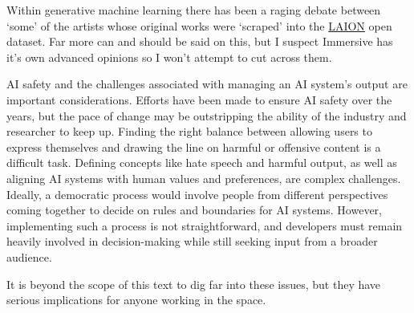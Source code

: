 Within generative machine learning there has been a raging debate between `some' of the artists whose original works were `scraped' into the \href{https://laion.ai/}{LAION} open dataset. Far more can and should be said on this, but I suspect Immersive has it's own advanced opinions so I won't attempt to cut across them.\par
AI safety and the challenges associated with managing an AI system's output are important considerations. Efforts have been made to ensure AI safety over the years, but the pace of change may be outstripping the ability of the industry and researcher to keep up. Finding the right balance between allowing users to express themselves and drawing the line on harmful or offensive content is a difficult task. Defining concepts like hate speech and harmful output, as well as aligning AI systems with human values and preferences, are complex challenges. Ideally, a democratic process would involve people from different perspectives coming together to decide on rules and boundaries for AI systems. However, implementing such a process is not straightforward, and developers must remain heavily involved in decision-making while still seeking input from a broader audience.\par
It is beyond the scope of this text to dig far into these issues, but they have serious implications for anyone working in the space. \par 
